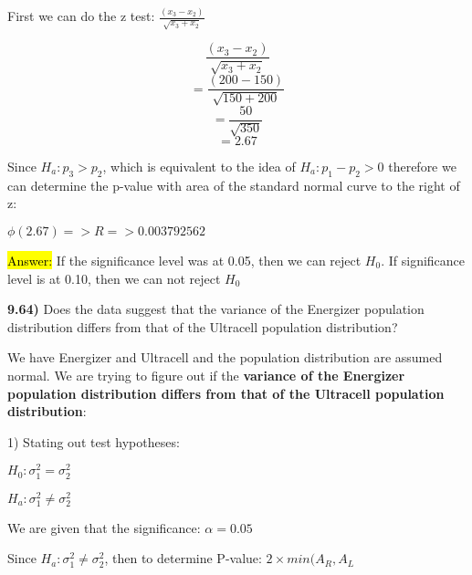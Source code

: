 \documentclass{article}
\begin{document}
\vspace{3mm}

First we can do the z test: $\frac{(x_{3}-x_{2})}{\sqrt{x_{3}+x_{2}}}$

$$\frac{(x_{3}-x_{2})}{\sqrt{x_{3}+x_{2}}}$$
$$=\frac{(200-150)}{\sqrt{150+200}}$$
$$=\frac{50}{\sqrt{350}}$$
$$=2.67$$

Since $H_{a}: p_{3} > p_{2}$, which is equivalent to the idea of $H_{a}: p_{1}-p_{2} > 0$ therefore we can determine the p-value with area of the standard normal curve to the right of z:

\vspace{3mm}

$\phi{(2.67)} => R => 0.003792562$

\vspace{3mm}


\hl{Answer:} If the significance level was at 0.05, then we can reject $H_{0}$. If significance level is at 0.10, then we can not reject $H_{0}$


\newpage

\textbf{9.64)} Does the data suggest that the variance of the Energizer population distribution differs from that of the Ultracell population distribution? 

\vspace{3mm}

We have Energizer and Ultracell and the population distribution are assumed normal. We are trying to figure out if the \textbf{variance of the Energizer population distribution differs from that of the Ultracell population distribution}:

\vspace{3mm}

1) Stating out test hypotheses:

\vspace{3mm}

$H_{0}: \sigma^{2}_{1}=\sigma^{2}_{2}$

\vspace{3mm}

$H_{a}: \sigma^{2}_{1} \ne \sigma^{2}_{2}$

\vspace{3mm}

We are given that the significance: $\alpha=0.05$

\vspace{3mm}

Since $H_{a}: \sigma^{2}_{1} \ne \sigma^{2}_{2}$, then to determine P-value: $2\times min(A_{R},A_{L}$
\end{document}
